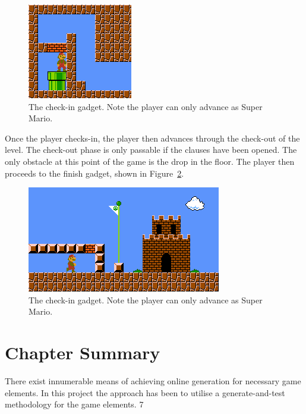 \documentclass[11pt, a4paper, oneside]{report} %
\begin{document}
\begin{figure}[ht!]

  \centering
    \includegraphics[scale=1.2]{check-out}
  \caption{The check-in gadget. Note the player can only advance as Super Mario.}
  \label{check-in}
\end{figure}

Once the player checks-in, the player then advances through the check-out of the
level. The check-out phase is only passable if the clauses have been opened. The
only obstacle at this point of the game is the drop in the floor. The player
then proceeds to the finish gadget, shown in Figure~\ref{finish}.

\begin{figure}[ht!]

  \centering
    \includegraphics[scale=1.0]{finish}
  \caption{The check-in gadget. Note the player can only advance as Super Mario.}
  \label{finish}
\end{figure}

\section{Chapter Summary}

There exist innumerable means of achieving online generation for necessary game
elements. In this project the approach has been to utilise a generate-and-test
methodology for the game elements. 7

\end{document}
